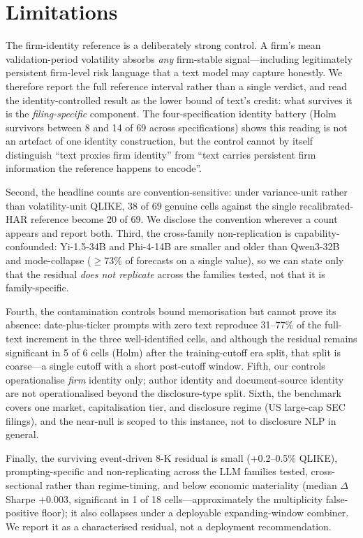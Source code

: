 \section{Limitations}
\label{sec:limitations}

The firm-identity reference is a deliberately strong control. A firm's mean validation-period volatility absorbs \emph{any} firm-stable signal---including legitimately persistent firm-level risk language that a text model may capture honestly. We therefore report the full reference interval rather than a single verdict, and read the identity-controlled result as the lower bound of text's credit: what survives it is the \emph{filing-specific} component. The four-specification identity battery (Holm survivors between 8 and 14 of 69 across specifications) shows this reading is not an artefact of one identity construction, but the control cannot by itself distinguish ``text proxies firm identity'' from ``text carries persistent firm information the reference happens to encode''.

Second, the headline counts are convention-sensitive: under variance-unit rather than volatility-unit QLIKE, 38 of 69 genuine cells against the single recalibrated-HAR reference become 20 of 69. We disclose the convention wherever a count appears and report both. Third, the cross-family non-replication is capability-confounded: Yi-1.5-34B and Phi-4-14B are smaller and older than Qwen3-32B and mode-collapse ($\geq$73\% of forecasts on a single value), so we can state only that the residual \emph{does not replicate} across the families tested, not that it is family-specific.

Fourth, the contamination controls bound memorisation but cannot prove its absence: date-plus-ticker prompts with zero text reproduce 31--77\% of the full-text increment in the three well-identified cells, and although the residual remains significant in 5 of 6 cells (Holm) after the training-cutoff era split, that split is coarse---a single cutoff with a short post-cutoff window. Fifth, our controls operationalise \emph{firm} identity only; author identity and document-source identity are not operationalised beyond the disclosure-type split. Sixth, the benchmark covers one market, capitalisation tier, and disclosure regime (US large-cap SEC filings), and the near-null is scoped to this instance, not to disclosure NLP in general.

Finally, the surviving event-driven 8-K residual is small ($+$0.2--0.5\% QLIKE), prompting-specific and non-replicating across the LLM families tested, cross-sectional rather than regime-timing, and below economic materiality (median $\Delta$Sharpe $+$0.003, significant in 1 of 18 cells---approximately the multiplicity false-positive floor); it also collapses under a deployable expanding-window combiner. We report it as a characterised residual, not a deployment recommendation.
